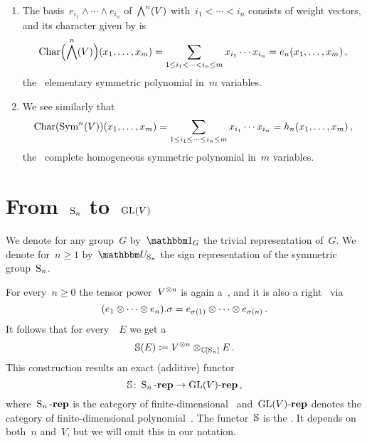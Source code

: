 \documentclass[a4paper,10pt]{scrartcl}
\begin{document}
\begin{example}
  \leavevmode
  \begin{enumerate}
    \item
      The basis~$e_{i_1} \wedge \dotsb \wedge e_{i_n}$ of~$\bigwedge^n(V)$ with~$i_1 < \dotsb < i_n$ consists of weight vectors, and its character given by is
      \[
        \operatorname{Char}\Bigl( \bigwedge^n(V) \Bigr)(x_1, \dotsc, x_m)
        =
        \sum_{1 \leq i_1 < \dotsb < i_n \leq m} x_{i_1} \dotsb x_{i_n}
        =
        e_n(x_1, \dotsc, x_m) \,,
      \]
      the~{} elementary symmetric polynomial in~$m$ variables.
    \item
      We see similarly that
      \[
        \operatorname{Char}(\operatorname{Sym}^n(V))(x_1, \dotsc, x_m)
        =
        \sum_{1 \leq i_1 \leq \dotsb \leq i_n \leq m} x_{i_1} \dotsb x_{i_n}
        =
        h_n(x_1, \dotsc, x_m) \,,
      \]
      the~{} complete homogeneous symmetric polynomial in~$m$ variables.
  \end{enumerate}
\end{example}





\section{From~$\operatorname{S}_n$ to~$\operatorname{GL}(V)$}

We denote for any group~$G$ by~$\trivrep_G$ the trivial representation of~$G$.
We denote for~$n \geq 1$ by~$\signrep_{\symm_n}$ the sign representation of the symmetric group~$\operatorname{S}_n$.

For every~$n \geq 0$ the tensor power~$V^{\otimes n}$ is again a~{}, and it is also a right~{} via
\[
  (e_1 \otimes \dotsb \otimes e_n) . \sigma
  =
  e_{\sigma(1)} \otimes \dotsb \otimes e_{\sigma(n)} \,.
\]
It follows that for every~{}~$E$ we get a~{}
\[
  \mathbb{S}(E)
  \coloneqq
  V^{\otimes n} \otimes_{\mathbb{C}[\operatorname{S}_n]} E \,.
\]
This construction results an exact (additive) functor
\[
  \mathbb{S}
  \colon
  \operatorname{S}_n\text{-}\mathbf{rep}
  \to
  \operatorname{GL}(V)\text{-}\mathbf{rep} \,,
\]
where~$\operatorname{S}_n\text{-}\mathbf{rep}$ is the category of finite-dimensional~{} and~$\operatorname{GL}(V)\text{-}\mathbf{rep}$ denotes the category of finite-dimensional polynomial~{}. 
The functor~$\mathbb{S}$ is the .
It depends on both~$n$ and~$V$, but we will omit this in our notation.
\end{document}
